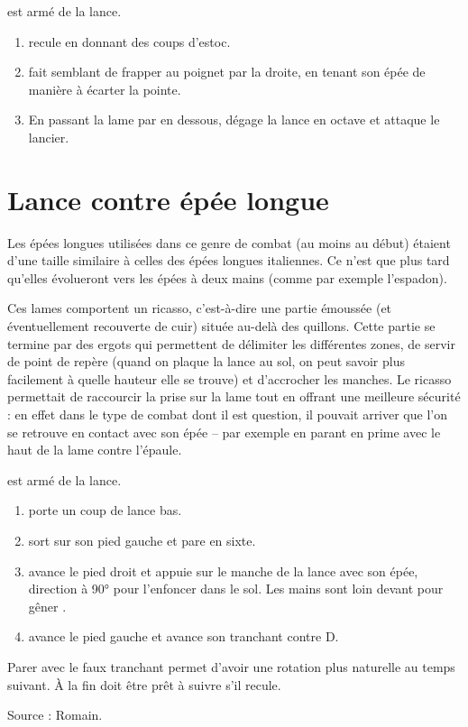 \begin{technique}

\D est armé de la lance.

\begin{enumerate}
	\item \D recule en donnant des coups d'estoc.
	
	\item \A fait semblant de frapper au poignet par la droite, en tenant son épée de manière à écarter la pointe.
	
	\item En passant la lame par en dessous, \A dégage la lance en octave et attaque le lancier.
\end{enumerate}
\end{technique}


\section{Lance contre épée longue}

Les épées longues utilisées dans ce genre de combat (au moins au début) étaient d'une taille similaire à celles des épées longues italiennes.
Ce n'est que plus tard qu'elles évolueront vers les épées à deux mains (comme par exemple l'espadon).

Ces lames comportent un ricasso, c'est-à-dire une partie émoussée (et éventuellement recouverte de cuir) située au-delà des quillons.
Cette partie se termine par des ergots qui permettent de délimiter les différentes zones, de servir de point de repère (quand on plaque la lance au sol, on peut savoir plus facilement à quelle hauteur elle se trouve) et d'accrocher les manches.
Le ricasso permettait de raccourcir la prise sur la lame tout en offrant une meilleure sécurité : en effet dans le type de combat dont il est question, il pouvait arriver que l'on se retrouve en contact avec son épée – par exemple en parant en prime avec le haut de la lame contre l'épaule.


\begin{technique}

\A est armé de la lance.

\begin{enumerate}
	\item \A porte un coup de lance bas.
	
	\item \D sort sur son pied gauche et pare en sixte.
	
	\item \D avance le pied droit et appuie sur le manche de la lance avec son épée, direction à 90° pour l'enfoncer dans le sol.
	Les mains sont loin devant pour gêner \A.
	
	\item \D avance le pied gauche et avance son tranchant contre D.
\end{enumerate}

Parer avec le faux tranchant permet d'avoir une rotation plus naturelle au temps suivant. 
À la fin \D doit être prêt à suivre \A s'il recule.

Source : Romain.
\end{technique}


